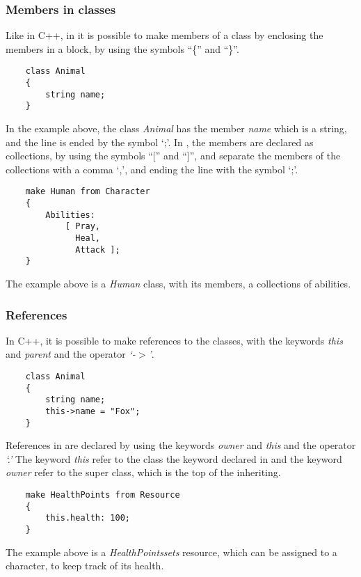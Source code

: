 \subsubsection*{Members in classes}
Like in C++, in \langname{} it is possible to make members of a class by enclosing the members in a block, by using the symbols ``\{'' and ``\}''.
\begin{lstlisting}
	class Animal
	{
		string name;
	}
\end{lstlisting}
In the example above, the class \emph{Animal} has the member \emph{name} which is a string, and the line is ended by the symbol `;'.
In \langname{}, the members are declared as collections, by using the symbols ``['' and ``]'', and separate the members of the collections with a comma `,', and ending the line with the symbol `;'.
\begin{lstlisting}
	make Human from Character
	{	
		Abilities:
			[ Pray, 
			  Heal,
			  Attack ];
	}
\end{lstlisting}
The example above is a \emph{Human} class, with its members, a collections of abilities.

\subsubsection*{References}
In C++, it is possible to make references to the classes, with the keywords \emph{this} and \emph{parent} and the operator \emph{`-$>$'}.
\begin{lstlisting}
	class Animal
	{
		string name;
		this->name = "Fox";
	}
\end{lstlisting}
 References in \langname{} are declared by using the keywords \emph{owner} and \emph{this} and the operator \emph{`.'} The keyword \emph{this} refer to the class the keyword declared in and the keyword \emph{owner} refer to the super class, which is the top of the inheriting. 
\begin{lstlisting}
	make HealthPoints from Resource
	{
		this.health: 100;
	}
\end{lstlisting}
The example above is a \emph{HealthPointssets} resource, which can be assigned to a character, to keep track of its health.